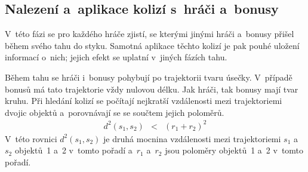

\subsection*{Nalezení a~aplikace kolizí s~hráči a~bonusy}

V~této fázi se pro každého hráče zjistí, se kterými jinými hráči a~bonusy přišel během svého tahu do styku. Samotná aplikace těchto kolizí je pak pouhé uložení informací o~nich; jejich efekt se uplatní v~jiných fázích tahu.

Během tahu se hráči i~bonusy pohybují po trajektorii tvaru úsečky. V~případě bonusů má tato trajektorie vždy nulovou délku. Jak hráči, tak bonusy mají tvar kruhu. Při hledání kolizí se počítají nejkratší vzdálenosti mezi trajektoriemi dvojic objektů a~porovnávají se se součtem jejich poloměrů.
\begin{eqnarray}
    d^2(s_1, s_2) & < & (r_1 + r_2)^2
\end{eqnarray}
V~této rovnici $d^2(s_1, s_2)$ je druhá mocnina vzdálenosti mezi trajektoriemi $s_1$ a~$s_2$ objektů~1 a~2 v~tomto pořadí a~$r_1$ a~$r_2$ jsou poloměry objektů~1 a~2 v~tomto pořadí.

